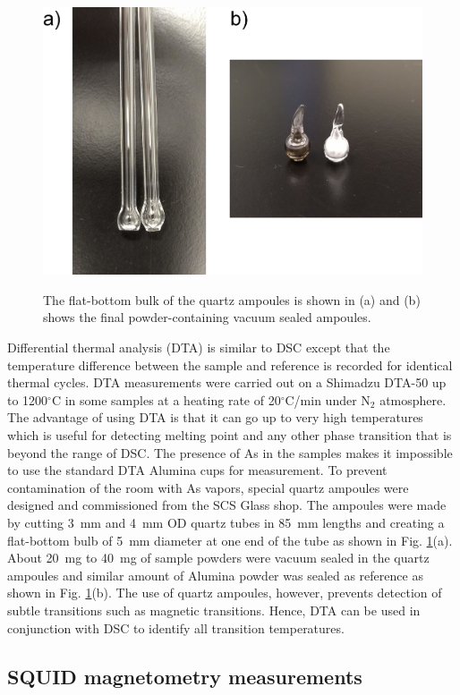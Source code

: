 \documentclass[10pt,doublespacing,edeposit]{uiucthesis2020}
\begin{document}
\begin{mainmatter}
\begin{figure}
\centering\includegraphics[width=0.8\columnwidth]{figures/ch3/DTA_tubes_combined.jpg} \\
\caption{\label{fig:DTA_tubes_combined}
The flat-bottom bulk of the quartz ampoules is shown in (a) and (b) shows the final powder-containing vacuum sealed ampoules.
}
\end{figure}

Differential thermal analysis (DTA) is similar to DSC except that the temperature difference between the sample and reference is recorded for identical thermal cycles. DTA measurements were carried out on a Shimadzu DTA-50 up to 1200$^\circ$C in some samples at a heating rate of 20$^\circ$C/min under N$_2$ atmosphere. The advantage of using DTA is that it can go up to very high temperatures which is useful for detecting melting point and any other phase transition that is beyond the range of DSC. The presence of As in the samples makes it impossible to use the standard DTA Alumina cups for measurement. To prevent contamination of the room with As vapors, special quartz ampoules were designed and commissioned from the SCS Glass shop. The ampoules were made by cutting 3~mm and 4~mm OD quartz tubes in 85~mm lengths and creating a flat-bottom bulb of 5~mm diameter at one end of the tube as shown in Fig. \ref{fig:DTA_tubes_combined}(a). About 20~mg to 40~mg of sample powders were vacuum sealed in the quartz ampoules and similar amount of Alumina powder was sealed as reference as shown in Fig. \ref{fig:DTA_tubes_combined}(b). The use of quartz ampoules, however, prevents detection of subtle transitions such as magnetic transitions. Hence, DTA can be used in conjunction with DSC to identify all transition temperatures.

\subsection{SQUID magnetometry measurements}


\end{mainmatter}
\end{document}
